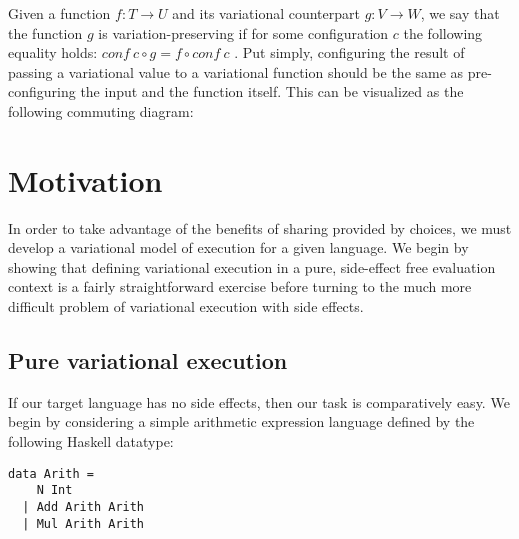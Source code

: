 \documentclass[12pt,oneside]{book}
\begin{document}
Given a function $f : T \rightarrow U$ and its variational counterpart $g : V \rightarrow W$, we say that
the function $g$ is variation-preserving if for some configuration $c$ the following equality holds:
$\mathit{conf}\ c \circ g = f \circ \mathit{conf}\ c$ \cite{HW16fosd}. Put simply, configuring the result
of passing a variational value to a variational function should be the same as pre-configuring the input
and the function itself. This can be visualized as the following commuting diagram:

\begin{center}
\end{center}




\chapter{Motivation}
\label{ch:mot}

In order to take advantage of the benefits of sharing provided by choices, we must develop a variational
model of execution for a given language. We begin by showing that defining variational execution in a pure,
side-effect free evaluation context is a fairly straightforward exercise before turning to the much more
difficult problem of variational execution with side effects.

\section{Pure variational execution}
\label{sec:purevar}

If our target language has no side effects, then
our task is comparatively easy. We begin by considering a simple arithmetic expression language
defined by the following Haskell datatype:

\begin{lstlisting}
data Arith =
    N Int
  | Add Arith Arith
  | Mul Arith Arith
\end{lstlisting}
\end{document}
